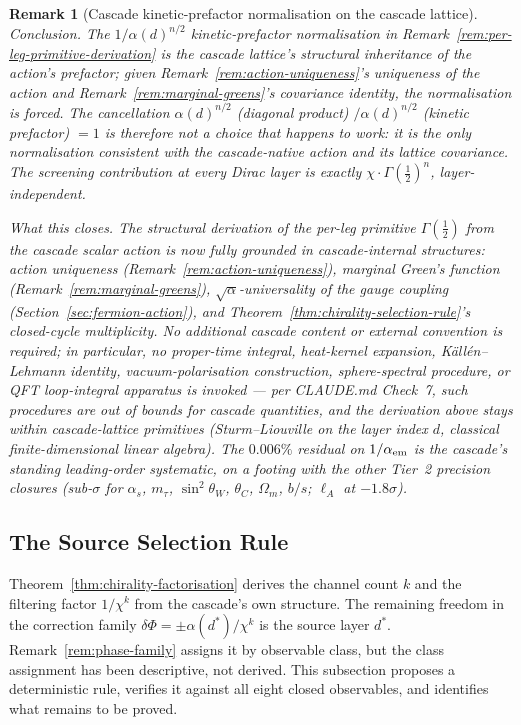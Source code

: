 \documentclass[12pt,a4paper]{article}
\newtheorem*{remark}{Remark}
\begin{document}
\begin{remark}[Cascade kinetic-prefactor normalisation on the cascade lattice]
\medskip\noindent\emph{Conclusion.} The $1/\alpha(d)^{n/2}$ kinetic-prefactor normalisation in Remark~\ref{rem:per-leg-primitive-derivation} is the cascade lattice's structural inheritance of the action's prefactor; given Remark~\ref{rem:action-uniqueness}'s uniqueness of the action and Remark~\ref{rem:marginal-greens}'s covariance identity, the normalisation is forced. The cancellation $\alpha(d)^{n/2}$ (diagonal product) $/\alpha(d)^{n/2}$ (kinetic prefactor) $= 1$ is therefore not a choice that happens to work: it is the only normalisation consistent with the cascade-native action and its lattice covariance. The screening contribution at every Dirac layer is exactly $\chi\cdot\Gamma(\tfrac{1}{2})^n$, layer-independent.

\medskip\noindent\emph{What this closes.} The structural derivation of the per-leg primitive $\Gamma(\tfrac{1}{2})$ from the cascade scalar action is now fully grounded in cascade-internal structures: action uniqueness (Remark~\ref{rem:action-uniqueness}), marginal Green's function (Remark~\ref{rem:marginal-greens}), $\sqrt{\alpha}$-universality of the gauge coupling (Section~\ref{sec:fermion-action}), and Theorem~\ref{thm:chirality-selection-rule}'s closed-cycle multiplicity. No additional cascade content or external convention is required; in particular, no proper-time integral, heat-kernel expansion, K\"all\'en--Lehmann identity, vacuum-polarisation construction, sphere-spectral procedure, or QFT loop-integral apparatus is invoked --- per CLAUDE.md Check~7, such procedures are out of bounds for cascade quantities, and the derivation above stays within cascade-lattice primitives (Sturm--Liouville on the layer index $d$, classical finite-dimensional linear algebra). The $0.006\%$ residual on $1/\alpha_{\rm em}$ is the cascade's standing leading-order systematic, on a footing with the other Tier~2 precision closures (sub-$\sigma$ for $\alpha_s$, $m_\tau$, $\sin^2\theta_W$, $\theta_C$, $\Omega_m$, $b/s$; $\ell_A$ at $-1.8\sigma$).
\end{remark}

\subsection{The Source Selection Rule}\label{subsec:source-selection}

Theorem~\ref{thm:chirality-factorisation} derives the channel count $k$ and the filtering factor $1/\chi^k$ from the cascade's own structure. The remaining freedom in the correction family $\delta\Phi=\pm\alpha(d^*)/\chi^k$ is the source layer $d^*$. Remark~\ref{rem:phase-family} assigns it by observable class, but the class assignment has been descriptive, not derived. This subsection proposes a deterministic rule, verifies it against all eight closed observables, and identifies what remains to be proved.
\end{document}
